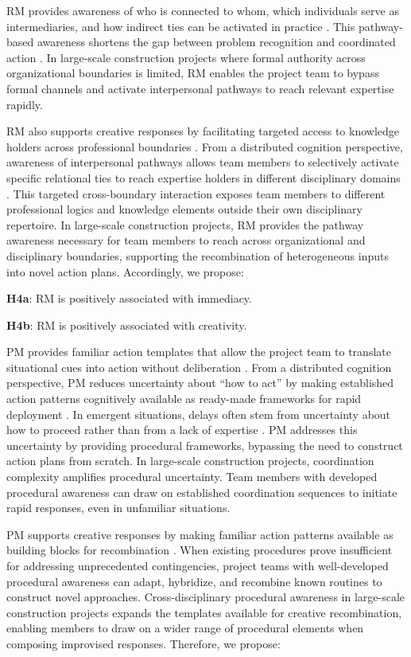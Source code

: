 \documentclass[authoryear,preprint,review,times,10pt]{elsarticle}
\begin{document}
RM provides awareness of who is connected to whom, which individuals serve as intermediaries, and how indirect ties can be activated in practice \citep{huang2017Ties}. This pathway-based awareness shortens the gap between problem recognition and coordinated action \citep{faraj2000Coordinating}. In large-scale construction projects where formal authority across organizational boundaries is limited, RM enables the project team to bypass formal channels and activate interpersonal pathways to reach relevant expertise rapidly.

RM also supports creative responses by facilitating targeted access to knowledge holders across professional boundaries \citep{faraj2000Coordinating}. From a distributed cognition perspective, awareness of interpersonal pathways allows team members to selectively activate specific relational ties to reach expertise holders in different disciplinary domains \citep{perry-smith2017Creativity, soda2019Network}. This targeted cross-boundary interaction exposes team members to different professional logics and knowledge elements outside their own disciplinary repertoire. In large-scale construction projects, RM provides the pathway awareness necessary for team members to reach across organizational and disciplinary boundaries, supporting the recombination of heterogeneous inputs into novel action plans. Accordingly, we propose:

\textbf{H4a}: RM is positively associated with immediacy.

\textbf{H4b}: RM is positively associated with creativity.

PM provides familiar action templates that allow the project team to translate situational cues into action without deliberation \citep{turner2022Improving}. From a distributed cognition perspective, PM reduces uncertainty about ``how to act'' by making established action patterns cognitively available as ready-made frameworks for rapid deployment \citep{faraj2000Coordinating}. In emergent situations, delays often stem from uncertainty about how to proceed rather than from a lack of expertise \citep{crossan2003Making}. PM addresses this uncertainty by providing procedural frameworks, bypassing the need to construct action plans from scratch. In large-scale construction projects, coordination complexity amplifies procedural uncertainty. Team members with developed procedural awareness can draw on established coordination sequences to initiate rapid responses, even in unfamiliar situations.

PM supports creative responses by making familiar action patterns available as building blocks for recombination \citep{ciborra1996Improvisation}. When existing procedures prove insufficient for addressing unprecedented contingencies, project teams with well-developed procedural awareness can adapt, hybridize, and recombine known routines to construct novel approaches. Cross-disciplinary procedural awareness in large-scale construction projects expands the templates available for creative recombination, enabling members to draw on a wider range of procedural elements when composing improvised responses. Therefore, we propose:
\end{document}

